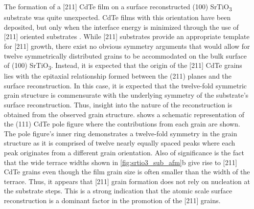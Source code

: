The formation of a [211] CdTe film on a surface reconstructed (100) SrTiO\textsubscript{3} substrate was quite unexpected.
CdTe films with this orientation have been deposited, but only when the interface energy is minimized through the use of [211] oriented substrates \cite{Lange1991b,Million1996,Rujirawat1997a,Zanatta1998}.
While [211] substrates provide an appropriate template for [211] growth, there exist no obvious symmetry arguments that would allow for twelve symmetrically distributed grains to be accommodated on the bulk surface of (100) SrTiO\textsubscript{3}.
Instead, it is expected that the origin of the [211] CdTe grains lies with the epitaxial relationship formed between the (211) planes and the surface reconstruction.
In this case, it is expected that the twelve-fold symmetric grain structure is commensurate with the underlying symmetry of the substrate’s surface reconstruction.
Thus, insight into the nature of the reconstruction is obtained from the observed grain structure.
 shows a schematic representation of the (111) CdTe pole figure where the contributions from each grain are shown.
The pole figure’s inner ring demonstrates a twelve-fold symmetry in the grain structure as it is comprised of twelve nearly equally spaced peaks where each peak originates from a different grain orientation.
Also of significance is the fact that the wide terrace widths shown in \cref{fig:srtio3_sub_afm}b give rise to [211] CdTe grains even though the film grain size is often smaller than the width of the terrace.
Thus, it appears that [211] grain formation does not rely on nucleation at the substrate steps.
This is a strong indication that the atomic scale surface reconstruction is a dominant factor in the promotion of the [211] grains.

